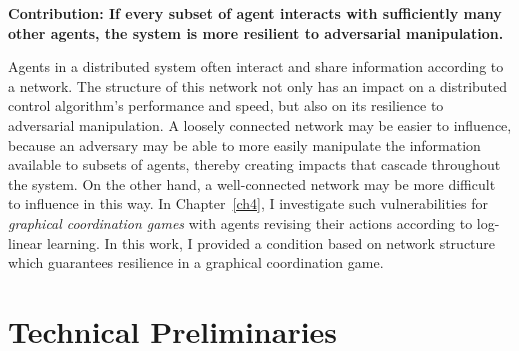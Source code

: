  \noindent\textbf{Contribution: If every subset of agent interacts with sufficiently many other agents, the system is more resilient to adversarial manipulation.}


Agents in a distributed system often interact and share information according to a network. The structure of this network not only has an impact on a distributed control algorithm's performance and speed, but also on its resilience to adversarial manipulation. A loosely connected network may be easier to influence, because an adversary may be able to more easily manipulate the information available to subsets of agents, thereby creating impacts that cascade throughout the system. On the other hand, a well-connected network may be more difficult to influence in this way. In Chapter~\ref{ch4}, I investigate such vulnerabilities for  {\it graphical coordination games} \cite{Ullmann1977,Cooper1999} with agents revising their actions according to log-linear learning. In this work, I provided a condition based on network structure which guarantees resilience in a graphical coordination game. 





\section{Technical Preliminaries}




